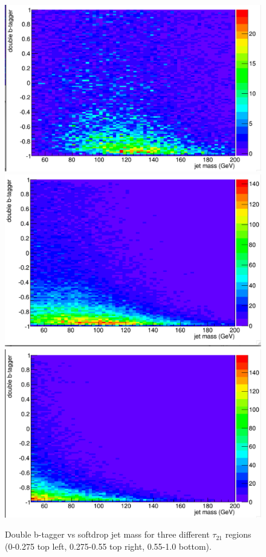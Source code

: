 \begin{figure}[thb!]
\begin{center}
\includegraphics[scale=0.35]{Figures/2Dtau21_0p275.pdf}
\includegraphics[scale=0.35]{Figures/2Dtau21_0p55.pdf}\\
\includegraphics[scale=0.35]{Figures/2Dtau21_1.pdf}
\end{center}
\caption{Double b-tagger vs softdrop jet mass for three different $\tau_{21}$ regions (0-0.275 top left, 0.275-0.55 top right, 0.55-1.0 bottom).}
\label{fig:tauslice}
\end{figure}

